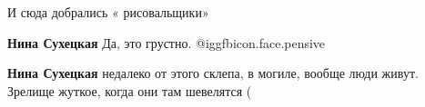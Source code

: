 
 
 
 
 



И сюда добрались « рисовальщики»

\textbf{Нина Сухецкая} Да, это грустно. @igg{fbicon.face.pensive} 

\textbf{Нина Сухецкая} недалеко от этого склепа, в могиле, вообще люди живут. Зрелище жуткое, когда они там шевелятся (
